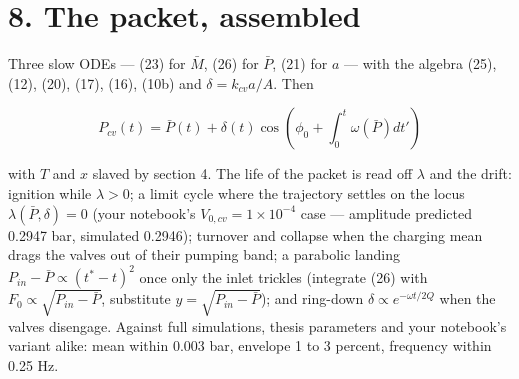 \documentclass[11pt]{article}
\begin{document}
\section*{8. The packet, assembled}

Three slow ODEs --- (23) for $\bar M$, (26) for $\bar P$, (21) for $a$ --- with the algebra (25), (12), (20), (17), (16), (10b) and $\delta = k_{cv}a/A$. Then

\begin{equation}
P_{cv}(t) = \bar P(t) + \delta(t)\cos\left(\phi_0 + \int_0^t\omega(\bar P)dt'\right) \tag{27}
\end{equation}

with $T$ and $x$ slaved by section 4. The life of the packet is read off $\lambda$ and the drift: ignition while $\lambda > 0$; a limit cycle where the trajectory settles on the locus $\lambda(\bar P, \delta) = 0$ (your notebook's $V_{0,cv} = 1\times10^{-4}$ case --- amplitude predicted 0.2947 bar, simulated 0.2946); turnover and collapse when the charging mean drags the valves out of their pumping band; a parabolic landing $P_{in} - \bar P \propto (t^\ast - t)^2$ once only the inlet trickles (integrate (26) with $F_0 \propto \sqrt{P_{in}-\bar P}$, substitute $y = \sqrt{P_{in}-\bar P}$); and ring-down $\delta \propto e^{-\omega t/2Q}$ when the valves disengage. Against full simulations, thesis parameters and your notebook's variant alike: mean within 0.003 bar, envelope 1 to 3 percent, frequency within 0.25 Hz.
\end{document}
